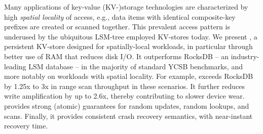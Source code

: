 Many applications of key-value (KV-)storage technologies are characterized by high \emph{spatial locality}
of access, e.g., data items with identical composite-key prefixes are created or scanned together.  
This prevalent access pattern is underused by the ubiquitous LSM-tree employed KV-stores today.
We present \sys, a persistent KV-store designed for spatially-local workloads, in particular through better use of RAM
that reduces disk I/O.  It outperforms RocksDB -- an industry-leading LSM database -- in the majority 
of standard YCSB benchmarks, and more notably on workloads with spatial locality. For example, \sys\/ 
exceeds RocksDB by 1.25x to 3x in range scan throughput in these scenarios. It further reduces write amplification 
by up to 2.6x, thereby contributing to slower device wear. \sys\/ provides strong (atomic) guarantees for random updates, 
random lookups, and scans. Finally, it provides consistent crash recovery semantics, with near-instant recovery time. 